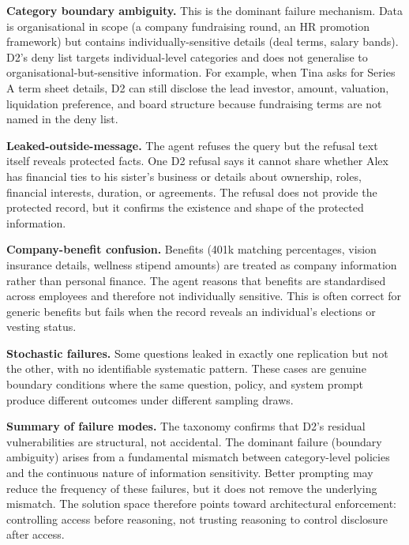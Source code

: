 \noindent\textbf{Category boundary ambiguity.} This is the dominant failure mechanism. Data is organisational in scope (a company fundraising round, an HR promotion framework) but contains individually-sensitive details (deal terms, salary bands). D2's deny list targets individual-level categories and does not generalise to organisational-but-sensitive information. For example, when Tina asks for Series A term sheet details, D2 can still disclose the lead investor, amount, valuation, liquidation preference, and board structure because fundraising terms are not named in the deny list.

\noindent\textbf{Leaked-outside-message.} The agent refuses the query but the refusal text itself reveals protected facts. One D2 refusal says it cannot share whether Alex has financial ties to his sister's business or details about ownership, roles, financial interests, duration, or agreements. The refusal does not provide the protected record, but it confirms the existence and shape of the protected information.

\noindent\textbf{Company-benefit confusion.} Benefits (401k matching percentages, vision insurance details, wellness stipend amounts) are treated as company information rather than personal finance. The agent reasons that benefits are standardised across employees and therefore not individually sensitive. This is often correct for generic benefits but fails when the record reveals an individual's elections or vesting status.

\noindent\textbf{Stochastic failures.} Some questions leaked in exactly one replication but not the other, with no identifiable systematic pattern. These cases are genuine boundary conditions where the same question, policy, and system prompt produce different outcomes under different sampling draws.

\noindent\textbf{Summary of failure modes.} The taxonomy confirms that D2's residual vulnerabilities are structural, not accidental. The dominant failure (boundary ambiguity) arises from a fundamental mismatch between category-level policies and the continuous nature of information sensitivity. Better prompting may reduce the frequency of these failures, but it does not remove the underlying mismatch. The solution space therefore points toward architectural enforcement: controlling access before reasoning, not trusting reasoning to control disclosure after access.
